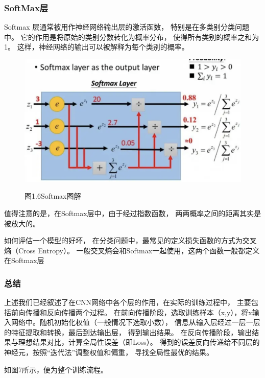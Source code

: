 \documentclass[10.5pt,compsoc,UTF8]{CjC}
\theoremstyle{mystyle}
\begin{document}
\subsubsection{SoftMax层}

Softmax 层通常被用作神经网络输出层的激活函数，
特别是在多类别分类问题中。
它的作用是将原始的类别分数转化为概率分布，
使得所有类别的概率之和为 1。
这样，神经网络的输出可以被解释为每个类别的概率。

\begin{figure}[htbp]
\centering
\centerline{\includegraphics[width=0.6\linewidth]{CNN6.png}}
\heiti 图1.6\quad  Softmax图解
\label{fig1}
\end{figure}

值得注意的是，在Softmax层中，由于经过指数函数，
两两概率之间的距离其实是被放大的。

如何评估一个模型的好坏，
在分类问题中，最常见的定义损失函数的方式为交叉熵（Cross Entropy）。
一般交叉熵会和Softmax一起使用，这两个函数一般都定义在Softmax层


\subsubsection{总结}

上述我们已经叙述了在CNN网络中各个层的作用，在实际的训练过程中，
主要包括前向传播和反向传播两个过程。
在前向传播阶段，选取训练样本（x,y），将x输入网络中。随机初始化权值（一般情况下选取小数），
信息从输入层经过一层一层的特征提取和转换，最后到达输出层，
得到输出结果。
在反向传播阶段，输出结果与理想结果对比，计算全局性误差（即Loss）。
得到的误差反向传递给不同层的神经元，按照“迭代法”调整权值和偏重，
寻找全局性最优的结果。

如图7所示，便为整个训练流程。

 
\end{document}
